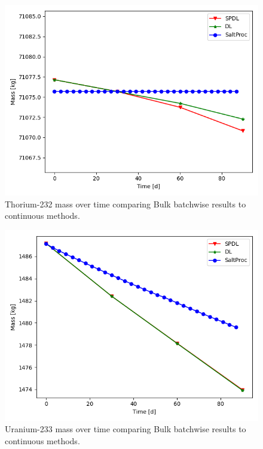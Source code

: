 \begin{figure}[H]
  \centering
  \includegraphics[scale=0.7]{images/soln-3-Th232.png}
  \caption{Thorium-232 mass over time comparing Bulk batchwise results to continuous methods.}
   \label{fig:bulk-comapre-th232}
\end{figure}

\begin{figure}[H]
  \centering
  \includegraphics[scale=0.7]{images/soln-3-U233.png}
  \caption{Uranium-233 mass over time comparing Bulk batchwise results to continuous methods.}
   \label{fig:bulk-comapre-u233}
\end{figure}

